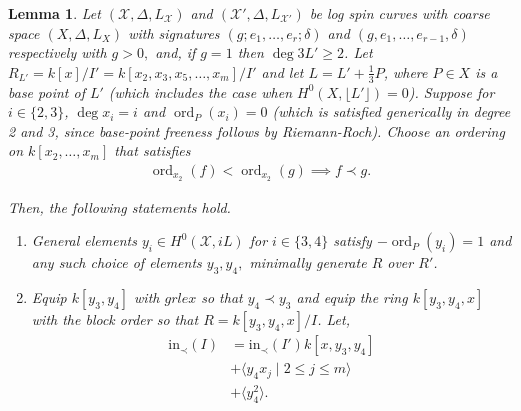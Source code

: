\documentclass{amsart}
\theoremstyle{plain}
\newtheorem{lem}[thm]{Lemma}
\theoremstyle{definition}
\theoremstyle{remark}
\numberwithin{equation}{section}
\newcommand \sx{\mathscr X}
\DeclareMathOperator{\ord}{ord}
\newcommand \halfcan{L}
\newcommand \initial{\text{in}}
\begin{document}
\begin{lem}
\label{lem:sat-2}
Let $(\sx, \Delta, \halfcan_\sx)$ and $(\sx', \Delta, \halfcan_{\sx'})$ be log spin curves with coarse space $(X, \Delta, \halfcan_X)$ with signatures $(g; e_1, \ldots, e_r; \delta)$ and $(g, e_1, \ldots, e_{r- 1}, \delta)$ respectively with $g > 0,$ and, if $g = 1$ then $\deg 3\halfcan' \geq 2$.
Let $R_{L'} = k[x]/I'= k[x_2, x_3
, x_5, \ldots, x_m]/I'$ and let $\halfcan = \halfcan' + \frac{1}{
3}P$, where $P\in X$ is a base point of $\halfcan'$ (which includes the case when $H^0(X, \lfloor \halfcan'\rfloor) = 0$).
Suppose for $i \in \{2, 3\}$, $\deg x_i = i$ and $\ord_P(x_i)= 0$ (which is satisfied generically in degree 2 and 3, since base-point freeness follows by Riemann-Roch). Choose an ordering on $k[x_2, \ldots, x_m]$ that satisfies
\begin{align*}
	\ord_{x_2}(f) < \ord_{x_2}(g) \implies f \prec g.
\end{align*}

\noindent
Then, the following statements hold.

\begin{enumerate}
	\item[(a)] General elements  $y_i \in H^0(\sx,iL)$ for $i \in
		\{3, 4\}$ satisfy $-\ord_P(y_i) = 1$ and any such choice of elements
		$y_3, y_4,$ minimally generate $R$ over $R'$.
	\item[(b)] Equip $k[y_3, y_4]$ with $grlex$ so that $y_4 \prec 
		y_3$
		and equip the ring $k[y_3, y_4, x]$ with the block 
		order so that $R = k[y_3, y_4, x]/I$. Let,
		\begin{align*}
			\initial_\prec(I) &= \initial_\prec(I')k[x, y_3, y_4] \\
			&+\langle y_4 x_j \mid 2 \leq j \leq m \rangle \\
			&+\langle y_4^2 \rangle.
		\end{align*}
\end{enumerate}
\end{lem}
\end{document}
